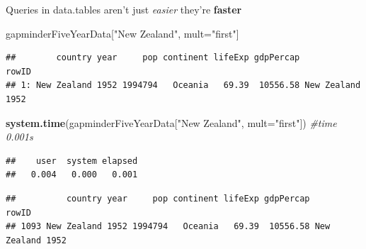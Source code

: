 \documentclass[]{article}
\newenvironment{Shaded}{\begin{snugshade}}{\end{snugshade}}
\newcommand{\KeywordTok}[1]{\textcolor[rgb]{0.13,0.29,0.53}{\textbf{{#1}}}}
\newcommand{\DataTypeTok}[1]{\textcolor[rgb]{0.13,0.29,0.53}{{#1}}}
\newcommand{\DecValTok}[1]{\textcolor[rgb]{0.00,0.00,0.81}{{#1}}}
\newcommand{\StringTok}[1]{\textcolor[rgb]{0.31,0.60,0.02}{{#1}}}
\newcommand{\CommentTok}[1]{\textcolor[rgb]{0.56,0.35,0.01}{\textit{{#1}}}}
\newcommand{\NormalTok}[1]{{#1}}
\begin{document}
Queries in data.tables aren't just \emph{easier} they're \textbf{faster}

\begin{Shaded}
\begin{Highlighting}[]
\NormalTok{gapminderFiveYearData[}\StringTok{"New Zealand"}\NormalTok{, mult=}\StringTok{"first"}\NormalTok{] }
\end{Highlighting}
\end{Shaded}

\begin{verbatim}
##        country year     pop continent lifeExp gdpPercap            rowID
## 1: New Zealand 1952 1994794   Oceania   69.39  10556.58 New Zealand 1952
\end{verbatim}

\begin{Shaded}
\begin{Highlighting}[]
\KeywordTok{system.time}\NormalTok{(gapminderFiveYearData[}\StringTok{"New Zealand"}\NormalTok{, }\DataTypeTok{mult=}\StringTok{"first"}\NormalTok{]) }\CommentTok{#time 0.001s}
\end{Highlighting}
\end{Shaded}

\begin{verbatim}
##    user  system elapsed 
##   0.004   0.000   0.001
\end{verbatim}

\begin{Shaded}
\end{Shaded}

\begin{verbatim}
##          country year     pop continent lifeExp gdpPercap            rowID
## 1093 New Zealand 1952 1994794   Oceania   69.39  10556.58 New Zealand 1952
\end{verbatim}

\begin{Shaded}
\end{Shaded}
\end{document}
